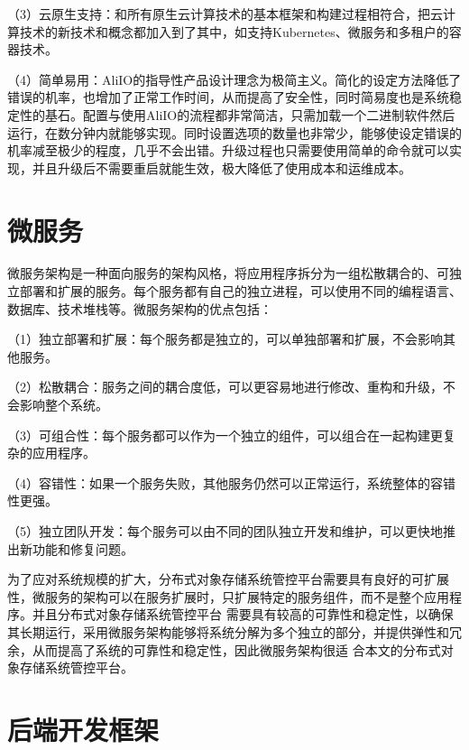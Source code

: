 （3）云原生支持：和所有原生云计算技术的基本框架和构建过程相符合，把云计算技术的新技术和概念都加入到了其中，如支持Kubernetes、微服务和多租户的容器技术。

（4）简单易用：AliIO的指导性产品设计理念为极简主义。简化的设定方法降低了错误的机率，也增加了正常工作时间，从而提高了安全性，同时简易度也是系统稳定性的基石。配置与使用AliIO的流程都非常简洁，只需加载一个二进制软件然后运行，在数分钟内就能够实现。同时设置选项的数量也非常少，能够使设定错误的机率减至极少的程度，几乎不会出错。升级过程也只需要使用简单的命令就可以实现，并且升级后不需要重启就能生效，极大降低了使用成本和运维成本。





\section{微服务}


微服务架构是一种面向服务的架构风格，将应用程序拆分为一组松散耦合的、可独立部署和扩展的服务\cite{koyong2015keji}。每个服务都有自己的独立进程，可以使用不同的编程语言、数据库、技术堆栈等。微服务架构的优点包括：

（1）独立部署和扩展：每个服务都是独立的，可以单独部署和扩展，不会影响其他服务。

（2）松散耦合：服务之间的耦合度低，可以更容易地进行修改、重构和升级，不会影响整个系统。

（3）可组合性：每个服务都可以作为一个独立的组件，可以组合在一起构建更复杂的应用程序。

（4）容错性：如果一个服务失败，其他服务仍然可以正常运行，系统整体的容错性更强。

（5）独立团队开发：每个服务可以由不同的团队独立开发和维护，可以更快地推出新功能和修复问题。

为了应对系统规模的扩大，分布式对象存储系统管控平台需要具有良好的可扩展性，微服务的架构可以在服务扩展时，只扩展特定的服务组件，而不是整个应用程序。并且分布式对象存储系统管控平台
需要具有较高的可靠性和稳定性，以确保其长期运行，采用微服务架构能够将系统分解为多个独立的部分，并提供弹性和冗余，从而提高了系统的可靠性和稳定性，因此微服务架构很适
合本文的分布式对象存储系统管控平台。

\section{后端开发框架}


